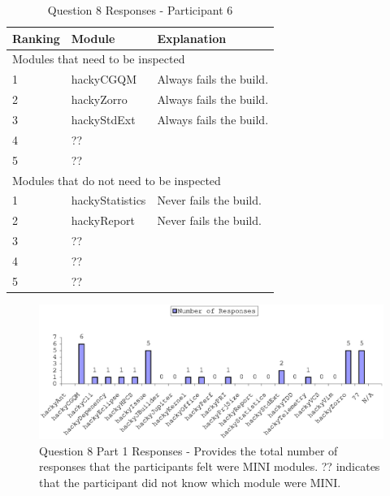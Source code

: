 \begin{table}[!h]
  \begin{center}
    \caption{Question 8 Responses - Participant 6}
    \label{tab:pre-selection-questionnaire-results-8-p6}
    \begin{tabular}{|p{2.0cm}|p{4.0cm}|p{7.0cm}|} \hline
{\bf Ranking} & {\bf Module} & {\bf Explanation} \\ \hline
\multicolumn{3}{|p{13.0cm}|}{Modules that need to be inspected} \\ \hline
1 & hackyCGQM & Always fails the build. \\ \hline
2 & hackyZorro & Always fails the build. \\ \hline
3 & hackyStdExt & Always fails the build. \\ \hline
4 & ?? & \\ \hline
5 & ?? & \\ \hline
\multicolumn{3}{|p{13.0cm}|}{Modules that do not need to be inspected} \\ \hline
1 & hackyStatistics & Never fails the build. \\ \hline
2 & hackyReport & Never fails the build. \\ \hline
3 & ?? & \\ \hline
4 & ?? & \\ \hline
5 & ?? & \\ \hline
    \end{tabular}
  \end{center}
\end{table}


\clearpage
\begin{figure}[!h]
  \centering
  \includegraphics[width=1.0\textwidth]{figs/Results/pre-selection-questionnaire-8.eps}
  \caption[Question 8 Part 1 Responses]{Question 8 Part 1 Responses -
    Provides the total number of responses that the participants felt were
    MINI modules. ?? indicates that the participant did not know which
    module were MINI.}
  \label{fig:pre-selection-questionnaire-results-8}
\end{figure}

